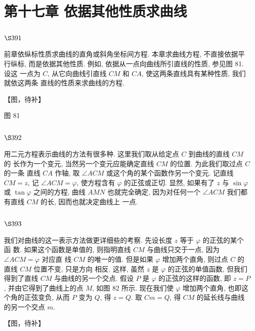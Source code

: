 \chapter{第十七章 依据其他性质求曲线}

\section{$\S 391$}
前章依纵标性质求曲线的直角或斜角坐标间方程. 本章求曲线方程, 不直接依据平 行纵标, 而是依据其他性质. 例如, 依据从一点向曲线所引直线的性质, 参见图 81. 设这 一点为 $C$, 从它向曲线引直线 $C M$ 和 $C A$, 使这两条直线具有某种性质, 我们就依这两条 直线的性质来求曲线的方程.


【图，待补】

图 81

\section{$\S 392$}

用二元方程表示曲线的方法有很多种. 这里我们取从给定点 $C$ 到曲线的直线 $C M$ 的 长作为一个变元, 当然另一个变元应能确定直线 $C M$ 的位置. 为此我们取过点 $C$ 的一条 直线 $C A$ 作轴, 取 $\angle A C M$ 或这个角的某个函数作另一个变元. 记直线 $C M=z$, 记 $\angle A C M=\varphi$, 使方程含有 $\varphi$ 的正弦或正切. 显然, 如果有了 $z$ 与 $\sin \varphi$ 或 $\tan \varphi$ 之间的方程, 曲线 $A M N$ 也就完全确定, 因为对任何一个 $\angle A C M$ 我们都有直线 $C M$ 的长, 因而也就决定曲线上 一点.

\section{$\S 393$}

我们对曲线的这一表示方法做更详细些的考察. 先设长度 $z$ 等于 $\varphi$ 的正弦的某个函 数. 如果这个函数是单值的, 则指明直线 $C M$ 与曲线只交于一点, 因为 $\angle A C M=\varphi$ 对应直 线 $C M$ 的唯一的值. 但是如果 $\varphi$ 增加两个直角, 则过点 $C$ 的直线 $C M$ 位置不变, 只是方向 相反. 这样, 虽然 $z$ 是 $\varphi$ 的正弦的单值函数, 但我们得到了直线 $C M$ 与曲线的另一个交点. 假设 $P$ 是 $\varphi$ 的正弦的这样的函数, 即 $z=P$, 并由它得到了曲线上的点 $M$, 如图 82 所示. 现在我们使 $\varphi$ 增加两个直角, 也即这个角的正弦变负, 从而 $P$ 变为 $Q$, 得 $z=Q$. 取 $C m=Q$, 得 $C M$ 的延长线与曲线的另一个交点 $m$.


【图，待补】

